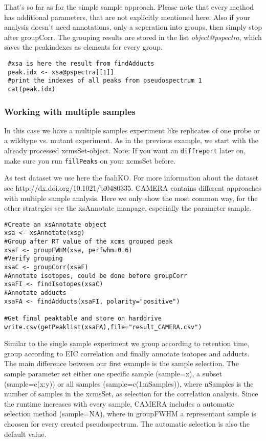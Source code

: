 \documentclass[a4paper,12pt]{article}
\newcommand{\Rfunction}[1]{{\texttt{#1}}}
\newcommand{\Rfunarg}[1]{{\textit{#1}}}
\begin{document}
That's so far as for the simple sample approach. Please note that every method
has additional parameters, that are not explicitly mentioned here. Also if your
analysis doesn't need annotations, only a seperation into groups, then simply
stop after groupCorr. The grouping results are stored in the list
\Rfunarg{object@pspectra}, which saves the peakindexes as elements for every group.

\begin{verbatim}
 #xsa is here the result from findAdducts
 peak.idx <- xsa@pspectra[[1]]
 #print the indexes of all peaks from pseudospectrum 1
 cat(peak.idx)
\end{verbatim}

\subsubsection{Working with multiple samples}
In this case we have a multiple samples experiment like replicates of one probe or a
wildtype vs. mutant experiment. As in the previous example, we start with the
already processed xcmsSet-object.
Note: If you want an \Rfunction{diffreport} later on, make sure you
run \Rfunction{fillPeaks} on your xcmsSet before.

As test dataset we use here the faahKO. For more information about the dataset
see http://dx.doi.org/10.1021/bi0480335.
CAMERA contains different approaches with multiple sample
analysis. Here we only show the most common way, for the other strategies see
the xsAnnotate manpage, especially the parameter sample.

\begin{verbatim}
#Create an xsAnnotate object
xsa <- xsAnnotate(xsg)
#Group after RT value of the xcms grouped peak
xsaF <- groupFWHM(xsa, perfwhm=0.6)
#Verify grouping
xsaC <- groupCorr(xsaF)
#Annotate isotopes, could be done before groupCorr
xsaFI <- findIsotopes(xsaC)
#Annotate adducts
xsaFA <- findAdducts(xsaFI, polarity="positive")

#Get final peaktable and store on harddrive
write.csv(getPeaklist(xsaFA),file="result_CAMERA.csv")
\end{verbatim}

Similar to the single sample experiment we group according to retention time, 
group according to EIC correlation and finally annotate isotopes and adducts.
The main difference between our first example is the sample selection.
The sample parameter set either one specific sample (sample=x),
a subset (sample=c(x:y)) or all samples (sample=c(1:nSamples)), 
where nSamples is the number of samples in the xcmsSet,
as selection for the correlation analysis. Since the runtime increases with every sample, CAMERA includes a
automatic selection method (sample=NA), where in groupFWHM a representant sample is choosen for every created pseudospectrum.
The automatic selection is also the default value.
\end{document}
